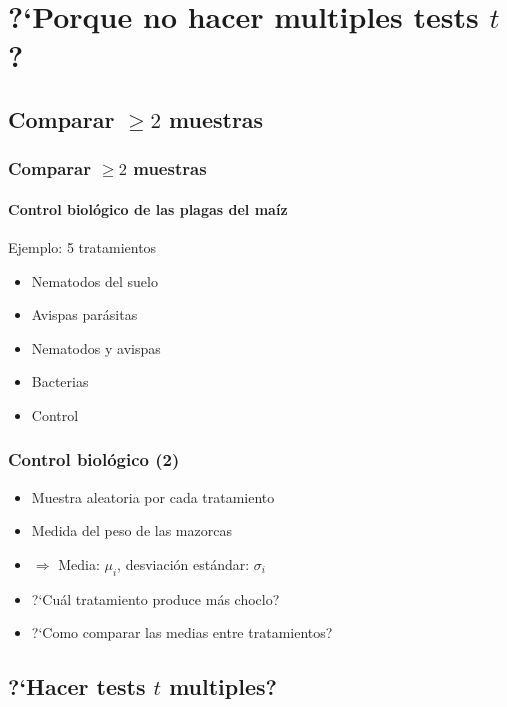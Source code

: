 \documentclass[mathserif]{beamer}
\begin{document}
\section[Introducci\'on]{?`Porque no hacer multiples tests $t$?}

\subsection[Comparar $\geq2$ muestras]{Comparar $\geq2$ muestras}

\begin{frame}[label=anov1]
   \frametitle{Comparar $\geq2$ muestras}
   \framesubtitle{Control biol\'ogico de las plagas del ma\'iz}
   \begin{exampleblock}{Ejemplo: 5 tratamientos}
      \begin{itemize}
         \item Nematodos del suelo
         \item Avispas par\'asitas
         \item Nematodos y avispas
         \item Bacterias
         \item Control
      \end{itemize}
   \end{exampleblock}
\end{frame}%


\begin{frame}[label=anov2]
   \frametitle{Control biol\'ogico (2)}
   \begin{itemize}
      \item Muestra aleatoria por cada tratamiento
      \item Medida del peso de las mazorcas
      \item[ ] $\Rightarrow$ Media: $\mu_i$, desviaci\'on est\'andar: $\sigma_i$
      \item ?`Cu\'al tratamiento produce m\'as choclo?
      \item ?`Como comparar las medias entre tratamientos?
   \end{itemize}
\end{frame}%

 
\subsection[?`Tests $t$ multiples?]{?`Hacer tests $t$ multiples?}
\end{document}
